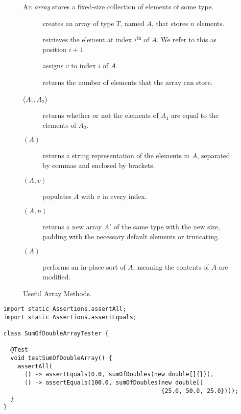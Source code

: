 \begin{figure}[tp]
  \small
  \begin{tcolorbox}[title=Java Arrays]
    An \emph{array} stores a fixed-size collection of elements of some type.
    \vspace{2ex}
  \begin{description}
    \item [] creates an array of type $T$, named $A$, that stores $n$ elements.
    \item [] retrieves the element at index $i^{\text{th}}$ of $A$. We refer to this as position $i + 1$.
    \item [] assigns $v$ to index $i$ of $A$.
    \item [] returns the number of elements that the array can store.
    \item [($A_1, A_2$)] returns whether or not the elements of $A_1$ are equal to the elements of $A_2$.
    \item [$(A)$] returns a string representation of the elements in $A$, separated by commas and enclosed by brackets.
    \item [$(A, v)$] populates $A$ with $v$ in every index.
    \item [$(A, n)$] returns a new array $A'$ of the same type with the new size, padding with the necessary default elements or truncating.
    \item [$(A)$] performs an in-place sort of $A$, meaning the contents of $A$ are modified.
  \end{description}
\end{tcolorbox}
  \caption{Useful Array Methods.}
  \label{fig:arrays}
\end{figure}

\enlargethispage{-4\baselineskip}

\begin{lstlisting}[language=MyJava]
import static Assertions.assertAll;
import static Assertions.assertEquals;

class SumOfDoubleArrayTester {

  @Test
  void testSumOfDoubleArray() {
    assertAll(
      () -> assertEquals(0.0, sumOfDoubles(new double[]{})),
      () -> assertEquals(100.0, sumOfDoubles(new double[]
                                             {25.0, 50.0, 25.0})));
  }
}
\end{lstlisting}


